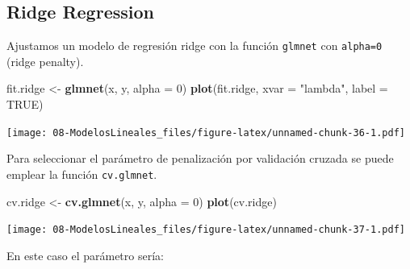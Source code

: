 \documentclass[]{book}
\newenvironment{Shaded}{\begin{snugshade}}{\end{snugshade}}
\newcommand{\DataTypeTok}[1]{\textcolor[rgb]{0.13,0.29,0.53}{#1}}
\newcommand{\DecValTok}[1]{\textcolor[rgb]{0.00,0.00,0.81}{#1}}
\newcommand{\FloatTok}[1]{\textcolor[rgb]{0.00,0.00,0.81}{#1}}
\newcommand{\KeywordTok}[1]{\textcolor[rgb]{0.13,0.29,0.53}{\textbf{#1}}}
\newcommand{\NormalTok}[1]{#1}
\newcommand{\OperatorTok}[1]{\textcolor[rgb]{0.81,0.36,0.00}{\textbf{#1}}}
\newcommand{\OtherTok}[1]{\textcolor[rgb]{0.56,0.35,0.01}{#1}}
\newcommand{\StringTok}[1]{\textcolor[rgb]{0.31,0.60,0.02}{#1}}
\begin{document}
\begin{Shaded}
\end{Shaded}

\hypertarget{ridge-regression}{%
\subsection{Ridge Regression}\label{ridge-regression}}

Ajustamos un modelo de regresión ridge con la función \texttt{glmnet} con \texttt{alpha=0} (ridge penalty).

\begin{Shaded}
\begin{Highlighting}[]
\NormalTok{fit.ridge <-}\StringTok{ }\KeywordTok{glmnet}\NormalTok{(x, y, }\DataTypeTok{alpha =} \DecValTok{0}\NormalTok{)}
\KeywordTok{plot}\NormalTok{(fit.ridge, }\DataTypeTok{xvar =} \StringTok{"lambda"}\NormalTok{, }\DataTypeTok{label =} \OtherTok{TRUE}\NormalTok{)}
\end{Highlighting}
\end{Shaded}

\texttt{[image: 08-ModelosLineales\_files/figure-latex/unnamed-chunk-36-1.pdf]}

Para seleccionar el parámetro de penalización por validación cruzada se puede emplear
la función \texttt{cv.glmnet}.

\begin{Shaded}
\begin{Highlighting}[]
\NormalTok{cv.ridge <-}\StringTok{ }\KeywordTok{cv.glmnet}\NormalTok{(x, y, }\DataTypeTok{alpha =} \DecValTok{0}\NormalTok{)}
\KeywordTok{plot}\NormalTok{(cv.ridge)}
\end{Highlighting}
\end{Shaded}

\texttt{[image: 08-ModelosLineales\_files/figure-latex/unnamed-chunk-37-1.pdf]}

En este caso el parámetro sería:

\begin{Shaded}
\end{Shaded}
\end{document}
